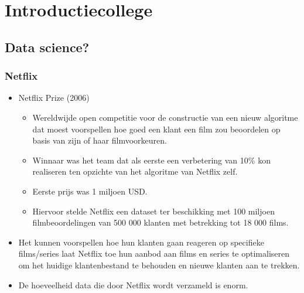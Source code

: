 \documentclass[]{tufte-book}
\providecommand{\tightlist}{%
  \setlength{\itemsep}{0pt}\setlength{\parskip}{0pt}}
\begin{document}
\hypertarget{introductiecollege}{%
\chapter{Introductiecollege}\label{introductiecollege}}

\hypertarget{data-science}{%
\section{Data science?}\label{data-science}}

\hypertarget{netflix}{%
\subsection{Netflix}\label{netflix}}

\begin{itemize}
\tightlist
\item
  Netflix Prize (2006)

  \begin{itemize}
  \tightlist
  \item
    Wereldwijde open competitie voor de constructie van een nieuw algoritme dat moest voorspellen hoe goed een klant een film zou beoordelen op basis van zijn of haar filmvoorkeuren.
  \item
    Winnaar was het team dat als eerste een verbetering van 10\% kon realiseren ten opzichte van het algoritme van Netflix zelf.
  \item
    Eerste prijs was 1 miljoen USD.
  \item
    Hiervoor stelde Netflix een dataset ter beschikking met 100 miljoen filmbeoordelingen van 500 000 klanten met betrekking tot 18 000 films.
  \end{itemize}
\item
  Het kunnen voorspellen hoe hun klanten gaan reageren op specifieke films/series laat Netflix toe hun aanbod aan films en series te optimaliseren om het huidige klantenbestand te behouden en nieuwe klanten aan te trekken.
\item
  De hoeveelheid data die door Netflix wordt verzameld is enorm.


\end{itemize}
\end{document}
